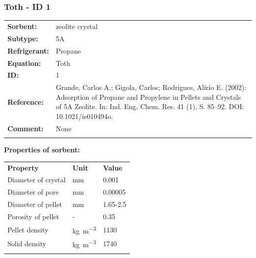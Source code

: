 \subsubsection{Toth - ID 1}
%
\begin{tabular}[l]{|lp{11.5cm}|}
\hline
\addlinespace

\textbf{Sorbent:} & zeolite crystal \\
\textbf{Subtype:} & 5A \\
\textbf{Refrigerant:} & Propane \\
\textbf{Equation:} & Toth \\
\textbf{ID:} & 1 \\
\textbf{Reference:} & Grande, Carlos A.; Gigola, Carlos; Rodrigues, Alírio E. (2002): Adsorption of Propane and Propylene in Pellets and Crystals of 5A Zeolite. In: Ind. Eng. Chem. Res. 41 (1), S. 85–92. DOI: 10.1021/ie010494o. \\
\textbf{Comment:} & None \\

\addlinespace
\hline
\end{tabular}
\newline

\textbf{Properties of sorbent:}
\newline
%
\begin{longtable}[l]{lll}
\toprule
\addlinespace
\textbf{Property} & \textbf{Unit} & \textbf{Value} \\
\addlinespace
\midrule
\endhead
\bottomrule
\endfoot
\bottomrule
\endlastfoot
\addlinespace

Diameter of crystal & \si{\milli\meter} & 0.001\\
Diameter of pore & \si{\milli\meter} & 0.00005\\
Diameter of pellet & \si{\milli\meter} & 1.65-2.5\\
Porosity of pellet & - & 0.35\\
Pellet density & \si{\kilogram\per\cubic\meter} & 1130\\
Solid density & \si{\kilogram\per\cubic\meter} & 1740\\

\addlinespace\end{longtable}

